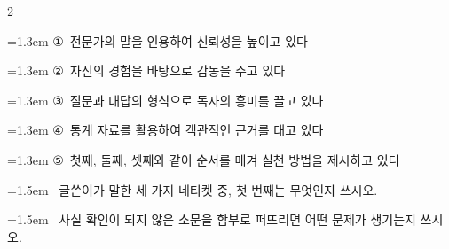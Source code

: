 \documentclass[11pt, a4paper]{article}
\begin{document}
\begin{multicols}{2}
\begin{minipage}{\columnwidth}
\vspace{0.5mm}
{\hangindent=1.3em  \noindent\hspace{0.3em}①~전문가의 말을 인용하여 신뢰성을 높이고 있다\par}
{\hangindent=1.3em  \noindent\hspace{0.3em}②~자신의 경험을 바탕으로 감동을 주고 있다\par}
{\hangindent=1.3em  \noindent\hspace{0.3em}③~질문과 대답의 형식으로 독자의 흥미를 끌고 있다\par}
{\hangindent=1.3em  \noindent\hspace{0.3em}④~통계 자료를 활용하여 객관적인 근거를 대고 있다\par}
{\hangindent=1.3em  \noindent\hspace{0.3em}⑤~첫째, 둘째, 셋째와 같이 순서를 매겨 실천 방법을 제시하고 있다\par}
\vspace{4mm}
\end{minipage}
\par

\noindent\begin{minipage}{\columnwidth}
\vspace{2mm}
{\hangindent=1.5em  ~글쓴이가 말한 세 가지 네티켓 중, 첫 번째는 무엇인지 쓰시오.\par}

\vspace{3mm}
\noindent\hrulefill
\vspace{2.5mm}
\noindent\hrulefill
\vspace{2.5mm}
\noindent\hrulefill
\vspace{2.5mm}
\noindent\hrulefill
\vspace{2.5mm}
\noindent\hrulefill
\vspace{2.5mm}
\vspace{1mm}
\vspace{4mm}
\end{minipage}
\par

\noindent\begin{minipage}{\columnwidth}
\vspace{2mm}
{\hangindent=1.5em  ~사실 확인이 되지 않은 소문을 함부로 퍼뜨리면 어떤 문제가 생기는지 쓰시오.\par}

\vspace{3mm}
\noindent\hrulefill
\vspace{2.5mm}
\noindent\hrulefill
\vspace{2.5mm}
\noindent\hrulefill
\vspace{2.5mm}
\noindent\hrulefill
\vspace{2.5mm}
\noindent\hrulefill
\vspace{2.5mm}
\vspace{1mm}
\vspace{4mm}
\end{minipage}
\par



\end{multicols}
\end{document}
